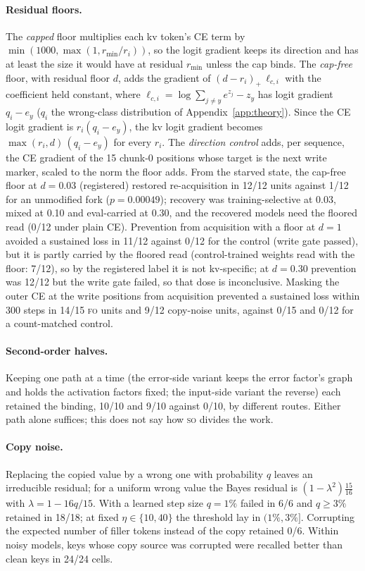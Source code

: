 \documentclass[11pt]{article}
\newcommand{\FO}{\textsc{fo}}
\newcommand{\SO}{\textsc{so}}
\begin{document}
\paragraph{Residual floors.} The \emph{capped} floor multiplies each kv token's CE term by
$\min(1000,\allowbreak\max(1,r_{\min}/r_i))$, so the logit gradient keeps its direction and has at least the
size it would have at residual $r_{\min}$ unless the cap binds. The \emph{cap-free} floor, with
residual floor $d$, adds the gradient of $(d-r_i)_+\,\ell_{c,i}$ with the coefficient held constant,
where $\ell_{c,i}=\log\sum_{j\neq y}e^{z_j}-z_y$ has logit gradient $q_i-e_y$ ($q_i$ the wrong-class
distribution of Appendix~\ref{app:theory}). Since the CE logit gradient is $r_i(q_i-e_y)$, the kv
logit gradient becomes $\max(r_i,d)\,(q_i-e_y)$ for every $r_i$. The \emph{direction control} adds, per
sequence, the CE gradient of the 15 chunk-0 positions whose target is the next write marker, scaled
to the norm the floor adds. From the starved state, the cap-free floor at $d=0.03$ (registered)
restored re-acquisition in 12/12 units against 1/12 for an unmodified fork ($p=0.00049$); recovery was
training-selective at 0.03, mixed at 0.10 and eval-carried at 0.30, and the recovered models need the
floored read (0/12 under plain CE). Prevention from acquisition with a floor at $d=1$ avoided a
sustained loss in 11/12 against 0/12 for the control (write gate passed), but it is partly carried by
the floored read (control-trained weights read with the floor: 7/12), so by the registered label it is
not kv-specific; at $d=0.30$ prevention was 12/12 but the write gate failed, so that dose is
inconclusive. Masking the outer CE at the write positions from acquisition prevented a sustained loss
within 300 steps in 14/15 \FO{} units and 9/12 copy-noise units, against 0/15 and 0/12 for a
count-matched control.

\paragraph{Second-order halves.} Keeping one path at a time (the error-side variant keeps the error
factor's graph and holds the activation factors fixed; the input-side variant the reverse) each
retained the binding, 10/10 and 9/10 against 0/10, by different routes. Either path alone suffices;
this does not say how \SO{} divides the work.

\paragraph{Copy noise.} Replacing the copied value by a wrong one with probability $q$ leaves an
irreducible residual; for a uniform wrong value the Bayes residual is $(1-\lambda^2)\tfrac{15}{16}$
with $\lambda=1-16q/15$. With a learned step size $q=1\%$ failed in 6/6 and $q\ge3\%$ retained in
18/18; at fixed $\eta\in\{10,40\}$ the threshold lay in $(1\%,3\%]$. Corrupting the expected number of
filler tokens instead of the copy retained 0/6. Within noisy models, keys whose copy source was
corrupted were recalled better than clean keys in 24/24 cells.
\end{document}
